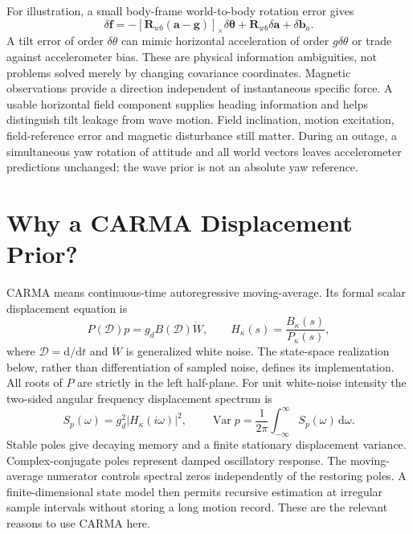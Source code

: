 \documentclass[conference]{IEEEtran}
\newcommand{\vc}[1]{\bm{#1}}
\newcommand{\mt}[1]{\bm{#1}}
\newcommand{\sk}[1]{[#1]_\times}
\newcommand{\dd}{\mathrm d}
\DeclareMathOperator{\Var}{Var}
\begin{document}
For illustration, a small body-frame world-to-body rotation error gives
\begin{equation}
 \delta\vc f=-\sk{\mt R_{wb}(\vc a-\vc g)}\delta\vc\theta
       +\mt R_{wb}\delta\vc a+\delta\vc b_a.
 \label{eq:ambiguity}
\end{equation}
A tilt error of order $\delta\theta$ can mimic horizontal acceleration of
order $g\delta\theta$ or trade against accelerometer bias. These are physical
information ambiguities, not problems solved merely by changing covariance
coordinates. Magnetic observations provide a direction independent of
instantaneous specific force. A usable horizontal field component supplies
heading information and helps distinguish tilt leakage from wave motion.
Field inclination, motion excitation, field-reference error and magnetic
disturbance still matter. During an outage, a simultaneous yaw rotation of
attitude and all world vectors leaves accelerometer predictions unchanged;
the wave prior is not an absolute yaw reference.
\section{Why a CARMA Displacement Prior?}
\label{sec:carma}
CARMA means continuous-time autoregressive moving-average. Its formal
scalar displacement equation is
\begin{equation}
 P(\mathcal D)p=g_d B(\mathcal D)\dot W,\qquad
 H_\kappa(s)=\frac{B_\kappa(s)}{P_\kappa(s)},
 \label{eq:carma}
\end{equation}
where $\mathcal D=\dd/\dd t$ and $\dot W$ is generalized white noise.
The state-space realization below, rather than differentiation of sampled
noise, defines its implementation. All roots of $P$ are strictly in the
left half-plane. For unit white-noise intensity the two-sided angular
frequency displacement spectrum is
\begin{equation}
 S_p(\omega)=g_d^2|H_\kappa(i\omega)|^2,\qquad
 \Var p=\frac{1}{2\pi}\int_{-\infty}^{\infty}S_p(\omega)\,\dd\omega.
 \label{eq:psd}
\end{equation}
Stable poles give decaying memory and a finite stationary displacement
variance. Complex-conjugate poles represent damped oscillatory response.
The moving-average numerator controls spectral zeros independently of the
restoring poles. A finite-dimensional state model then permits recursive
estimation at irregular sample intervals without storing a long motion
record. These are the relevant reasons to use CARMA here.
\end{document}
